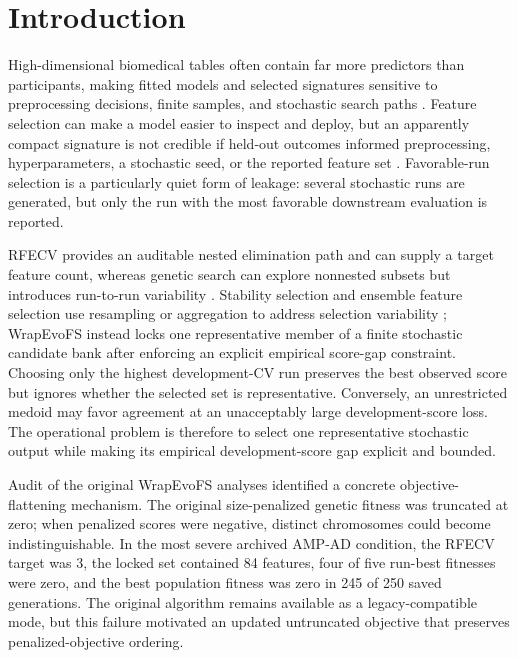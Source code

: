 \FloatBarrier
\section{Introduction}

High-dimensional biomedical tables often contain far more predictors than participants, making fitted models and selected signatures sensitive to preprocessing decisions, finite samples, and stochastic search paths \citep{ref01,ref02,ref03}. Feature selection can make a model easier to inspect and deploy, but an apparently compact signature is not credible if held-out outcomes informed preprocessing, hyperparameters, a stochastic seed, or the reported feature set \citep{ref06,ref07,ref08,ref38}. Favorable-run selection is a particularly quiet form of leakage: several stochastic runs are generated, but only the run with the most favorable downstream evaluation is reported.

RFECV provides an auditable nested elimination path and can supply a target feature count, whereas genetic search can explore nonnested subsets but introduces run-to-run variability \citep{ref12,ref13,ref15,ref16}. Stability selection and ensemble feature selection use resampling or aggregation to address selection variability \citep{ref09,ref40}; WrapEvoFS instead locks one representative member of a finite stochastic candidate bank after enforcing an explicit empirical score-gap constraint. Choosing only the highest development-CV run preserves the best observed score but ignores whether the selected set is representative. Conversely, an unrestricted medoid may favor agreement at an unacceptably large development-score loss. The operational problem is therefore to select one representative stochastic output while making its empirical development-score gap explicit and bounded.

Audit of the original WrapEvoFS analyses identified a concrete objective-flattening mechanism. The original size-penalized genetic fitness was truncated at zero; when penalized scores were negative, distinct chromosomes could become indistinguishable. In the most severe archived AMP-AD condition, the RFECV target was 3, the locked set contained 84 features, four of five run-best fitnesses were zero, and the best population fitness was zero in 245 of 250 saved generations. The original algorithm remains available as a legacy-compatible mode, but this failure motivated an updated untruncated objective that preserves penalized-objective ordering.

